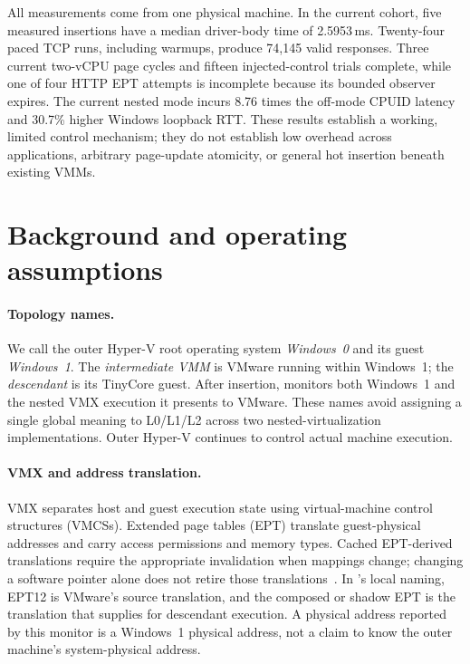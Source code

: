 All measurements come from one physical machine. In the current cohort, five
measured insertions have a median driver-body time of 2.5953\,ms. Twenty-four
paced TCP runs, including warmups, produce 74,145 valid responses. Three current
two-vCPU page cycles and fifteen injected-control trials complete, while one of
four HTTP EPT attempts is incomplete because its bounded observer expires.
The current nested mode incurs 8.76 times the off-mode CPUID latency and
30.7\% higher Windows loopback RTT. These results establish a working, limited
control mechanism; they do not establish low overhead across applications,
arbitrary page-update atomicity, or general hot insertion beneath existing VMMs.

\section{Background and operating assumptions}
\label{sec:background}
\paragraph{Topology names.}
We call the outer Hyper-V root operating system \emph{Windows~0} and its guest
\emph{Windows~1}. The \emph{intermediate VMM} is VMware running within Windows~1;
the \emph{descendant} is its TinyCore guest. After insertion, \ks{} monitors both
Windows~1 and the nested VMX execution it presents to VMware. These names avoid
assigning a single global meaning to L0/L1/L2 across two nested-virtualization
implementations. Outer Hyper-V continues to control actual machine execution.

\paragraph{VMX and address translation.}
VMX separates host and guest execution state using virtual-machine control
structures (VMCSs). Extended page tables (EPT) translate guest-physical addresses
and carry access permissions and memory types. Cached EPT-derived translations
require the appropriate invalidation when mappings change; changing a software
pointer alone does not retire those translations~\cite{intel}. In \ks{}'s local
naming, EPT12 is VMware's source translation, and the composed or shadow EPT
is the translation that \ks{} supplies for descendant execution. A physical
address reported by this monitor is a Windows~1 physical address, not a claim
to know the outer machine's system-physical address.

